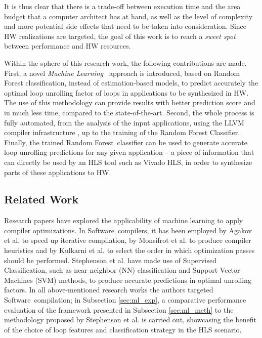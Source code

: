 \documentclass[]{usiinfthesis}
\newcommand{\SW}{{Software}}
\newcommand{\SoTA}{{state-of-the-art}}
\newcommand{\ML}{{Machine Learning}}
\newcommand{\RF}{{Random Forest}}
\begin{document}
It is thus clear that there is a trade-off between execution time and the area budget that 
a computer architect has at hand, as well as the level of complexity and more potential 
side effects that need to be taken into consideration. Since HW realizations are targeted, 
the goal of this work is to reach a {\em sweet spot} between performance and HW resources.\par

Within the sphere of this research work, the following contributions are made.
First, a novel {\em \ML\ }
approach is introduced, based on Random Forest classification, 
instead of estimation-based models, to predict 
accurately the optimal loop unrolling factor of loops in applications to be synthesized
in HW. The use of this methodology can provide results with better prediction score
and in much less time, compared to the \SoTA.
Second, the whole process is fully automated, from the analysis of the input applications, 
using the LLVM compiler infrastructure \cite{LattnerMar04}, up to the training of the Random 
Forest Classifier. Finally, the trained \RF\ classifier can be used to generate accurate loop 
unrolling predictions for any given application -- a piece of information that can 
directly be used by an HLS tool such as Vivado HLS, in order to synthesize parts of these 
applications to HW.

\subsection{Related Work}

Research papers have explored the applicability of machine learning to apply
compiler optimizations. In \SW\ compilers, it has been
employed by Agakov et al. \cite{AgakovMar06} to speed up iterative compilation,
by Monsifrot et al. \cite{MonsifrotAug02} to produce compiler heuristics
and by Kulkarni et al. \cite{KulkarniOct12} to select the order in which optimization passes
should be performed. Stephenson et al. \cite{StephensonApr05} have made use of Supervised 
Classification, such as near neighbor (NN) classification 
and Support Vector Machines (SVM) methods, to produce accurate predictions in optimal unrolling 
factors.
In all above-mentioned research works the authors targeted \SW\ 
compilation; in Subsection \ref{sec:ml_exp}, a comparative performance evaluation of the 
framework presented in Subsection \ref{sec:ml_meth} to the methodology proposed by 
Stephenson et al. is carried out, showcasing the benefit of the choice of loop features and 
classification strategy in the HLS scenario.\par
\end{document}
